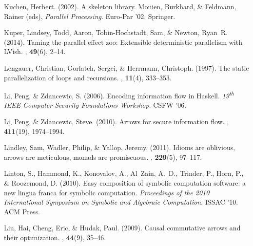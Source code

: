 \documentclass{jfp1}
\DeclareRobustCommand{\xth}{\textsuperscript{th}\xspace}
\DeclareRobustCommand{\xth}{\textsuperscript{th}\xspace}
\begin{document}
\begin{thebibliography}{}
Kuchen, Herbert. (2002).
\newblock A skeleton library.
 Monien, Burkhard, \& Feldmann, Rainer
  (eds), {\em Parallel Processing}.
\newblock Euro-Par '02.
\newblock Springer.

Kuper, Lindsey, Todd, Aaron, Tobin-Hochstadt, Sam, \& Newton, Ryan~R. (2014).
\newblock Taming the parallel effect zoo: Extensible deterministic parallelism
  with {LVish}.
, {\bf 49}(6), 2--14.

Lengauer, Christian, Gorlatch, Sergei, \& Herrmann, Christoph. (1997).
\newblock The static parallelization of loops and recursions.
, {\bf 11}(4), 333--353.

Li, Peng, \& Zdancewic, S. (2006).
\newblock Encoding information flow in {Haskell}.
 {\em 19\xth IEEE Computer Security
  Foundations Workshop}.
\newblock CSFW '06.

Li, Peng, \& Zdancewic, Steve. (2010).
\newblock Arrows for secure information flow.
, {\bf 411}(19), 1974--1994.

Lindley, Sam, Wadler, Philip, \& Yallop, Jeremy. (2011).
\newblock Idioms are oblivious, arrows are meticulous, monads are promiscuous.
, {\bf 229}(5),
  97--117.

Linton, S., Hammond, K., Konovalov, A., Al~Zain, A.~D., Trinder, P., Horn, P.,
  \& Roozemond, D. (2010).
\newblock Easy composition of symbolic computation software: a new lingua
  franca for symbolic computation.
 {\em Proceedings of the 2010 International
  Symposium on Symbolic and Algebraic Computation}.
\newblock ISSAC '10.
\newblock ACM Press.

Liu, Hai, Cheng, Eric, \& Hudak, Paul. (2009).
\newblock Causal commutative arrows and their optimization.
, {\bf 44}(9), 35--46.


\end{thebibliography}
\end{document}
